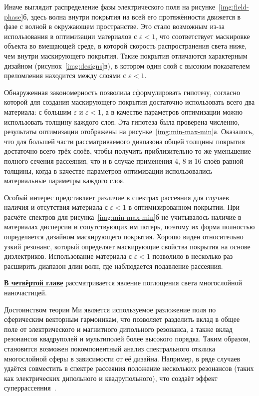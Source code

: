 Иначе выглядит распределение фазы электрического поля на
рисунке~\ref{img:field-phase}б, здесь волна внутри покрытия на всей его
протяжённости движется в фазе с волной в окружающем пространстве. Это
стало возможным из-за использования в оптимизации материалов с
${\varepsilon<1}$, что соответствует маскировке объекта во вмещающей
среде, в которой скорость распространения света ниже, чем внутри
маскирующего покрытия.  Такие покрытия отличаются характерным дизайном
(рисунок~\ref{img:designs}в), в котором один слой с высоким
показателем преломления находится между слоями с ${\varepsilon<1}$.

Обнаруженная закономерность позволила сформулировать гипотезу,
согласно которой для создания маскирующего покрытия достаточно
использовать всего два материала: с большим $\varepsilon$ и
${\varepsilon<1}$, а в качестве параметров оптимизации можно
использовать толщину каждого слоя. Эта гипотеза была проверена
численно, результаты оптимизации отображены на
рисунке~\ref{img:min-max-min}а. Оказалось, что для большей части
рассматриваемого диапазона общей толщины покрытия достаточно всего
трёх слоёв, чтобы получить приблизительно то же уменьшение полного
сечения рассеяния, что и в случае применения 4, 8 и 16 слоёв равной
толщины, когда в качестве параметров оптимизации использовались
материальные параметры каждого слоя.

Особый интерес представляет различие в спектрах рассеяния для случаев
наличия и отсутствия материала с ${\varepsilon<1}$ в оптимизированном
покрытии.  При расчёте спектров для рисунка~\ref{img:min-max-min}б не
учитывалось наличие в материалах дисперсии и сопутствующих им потерь,
поэтому их форма полностью определяется дизайном маскирующего
покрытия. Хорошо виден относительно узкий резонанс, который определяет
маскирующие свойства покрытия на основе диэлектриков. Использование
материала с ${\varepsilon<1}$ позволило в несколько раз расширить
диапазон длин волн, где наблюдается подавление рассеяния. 


\underline{\textbf{В четвёртой главе}} рассматривается явление
поглощения света многослойной наночастицей.

Достоинством теории Ми является используемое разложение поля по
сферическим векторным гармоникам, что позволяет разделить вклад в
общее поле от электрического и магнитного дипольного резонанса, а
также вклад резонансов квадруполей и мультиполей более высокого
порядка. Таким образом, становится возможен покомпонентный анализ
спектрального отклика многослойной сферы в зависимости от её
дизайна. Например, в ряде случаев удаётся совместить в спектре
рассеяния положение нескольких резонансов (таких как электрических
дипольного и квадрупольного), что создаёт эффект
суперрассеяния~\cite{Fan-2010,Fan-2011}.

